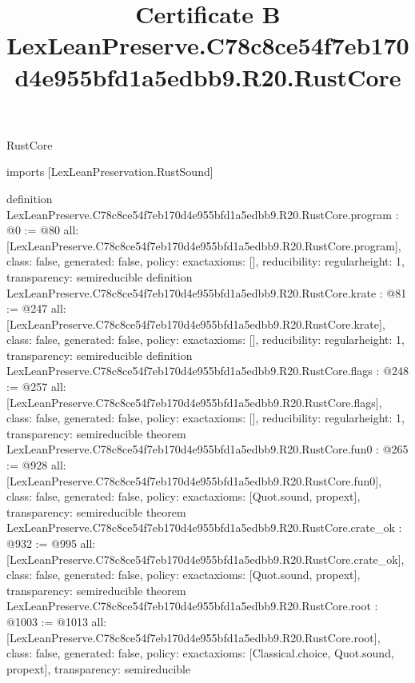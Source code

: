 \begin{lexlean}{RustCore}
\title{Certificate B LexLeanPreserve.C78c8ce54f7eb170d4e955bfd1a5edbb9.R20.RustCore}
\begin{coremodule}
imports [LexLeanPreservation.RustSound]

definition LexLeanPreserve.C78c8ce54f7eb170d4e955bfd1a5edbb9.R20.RustCore.program : @0 := @80 {
  all: [LexLeanPreserve.C78c8ce54f7eb170d4e955bfd1a5edbb9.R20.RustCore.program],
  class: false,
  generated: false,
  policy: exact{axioms: []},
  reducibility: regular{height: 1},
  transparency: semireducible
}
definition LexLeanPreserve.C78c8ce54f7eb170d4e955bfd1a5edbb9.R20.RustCore.krate : @81 := @247 {
  all: [LexLeanPreserve.C78c8ce54f7eb170d4e955bfd1a5edbb9.R20.RustCore.krate],
  class: false,
  generated: false,
  policy: exact{axioms: []},
  reducibility: regular{height: 1},
  transparency: semireducible
}
definition LexLeanPreserve.C78c8ce54f7eb170d4e955bfd1a5edbb9.R20.RustCore.flags : @248 := @257 {
  all: [LexLeanPreserve.C78c8ce54f7eb170d4e955bfd1a5edbb9.R20.RustCore.flags],
  class: false,
  generated: false,
  policy: exact{axioms: []},
  reducibility: regular{height: 1},
  transparency: semireducible
}
theorem LexLeanPreserve.C78c8ce54f7eb170d4e955bfd1a5edbb9.R20.RustCore.fun0 : @265 := @928 {
  all: [LexLeanPreserve.C78c8ce54f7eb170d4e955bfd1a5edbb9.R20.RustCore.fun0],
  class: false,
  generated: false,
  policy: exact{axioms: [Quot.sound, propext]},
  transparency: semireducible
}
theorem LexLeanPreserve.C78c8ce54f7eb170d4e955bfd1a5edbb9.R20.RustCore.crate_ok : @932 := @995 {
  all: [LexLeanPreserve.C78c8ce54f7eb170d4e955bfd1a5edbb9.R20.RustCore.crate_ok],
  class: false,
  generated: false,
  policy: exact{axioms: [Quot.sound, propext]},
  transparency: semireducible
}
theorem LexLeanPreserve.C78c8ce54f7eb170d4e955bfd1a5edbb9.R20.RustCore.root : @1003 := @1013 {
  all: [LexLeanPreserve.C78c8ce54f7eb170d4e955bfd1a5edbb9.R20.RustCore.root],
  class: false,
  generated: false,
  policy: exact{axioms: [Classical.choice, Quot.sound, propext]},
  transparency: semireducible
}


\end{coremodule}
\end{lexlean}
